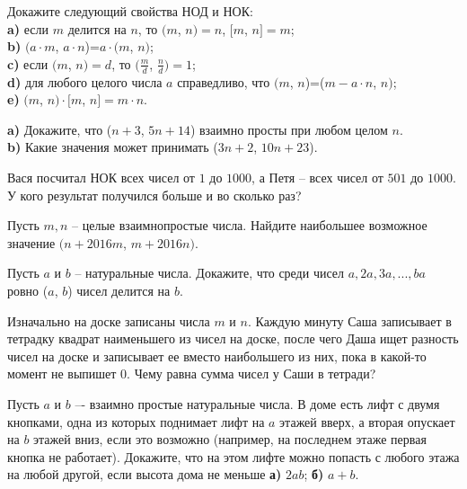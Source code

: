 \begin{problems}
\item Докажите следующий свойства НОД и НОК:\\
\textbf{a)} если $m$ делится на $n$, то $(m$, $n)=n$, $[m$, $n]=m$;\\
\textbf{b)} $(a \cdot m$, $a \cdot n$)=$a\cdot (m$, $n)$;\\
\textbf{c)} если $(m$, $n)=d$, то $(\frac{m}{d}$, $\frac{n}{d})=1$;\\
\textbf{d)} для любого целого числа $a$ справедливо, что $(m$, $n$)=($m-a \cdot n$, $n)$;\\
\textbf{e)} $(m$, $n) \cdot [m$, $n]=m\cdot n$.
\item \textbf{a)} Докажите, что ($n+3$, $5n+14$)  взаимно просты при любом целом $n$.\\  
\textbf{b)} Какие значения может принимать ($3n+2$, $10n+23$).
\item Вася посчитал НОК всех чисел от $1$ до $1000$, а Петя -- всех чисел от $501$ до $1000$. У кого результат получился больше и во сколько раз?

\item Пусть $m,n$ -- целые взаимнопростые числа. Найдите наибольшее возможное значение $(n+2016m$, $m+2016n)$.

\item Пусть $a$ и $b$ -- натуральные числа. Докажите, что среди чисел $a, 2a, 3a,...,ba$ ровно ($a$, $b$) чисел делится на $b$.

\item Изначально на доске записаны числа $m$ и $n$. Каждую минуту Саша записывает в тетрадку квадрат наименьшего из чисел на доске, после чего Даша ищет разность чисел на доске и записывает ее вместо наибольшего из них, пока в какой-то момент не выпишет $0$. Чему равна сумма  чисел у Саши в тетради?

\item Пусть $a$ и $b$ –- взаимно простые натуральные числа. В доме есть лифт с двумя кнопками, одна из которых
поднимает лифт на $a$ этажей вверх, а вторая опускает на $b$ этажей вниз, если это возможно (например, на последнем этаже первая кнопка не работает). Докажите, что на этом лифте можно попасть с любого этажа на любой другой, если высота дома не меньше
\textbf{а)} $2ab$; \textbf{б)} $a + b$.


\end{problems}

